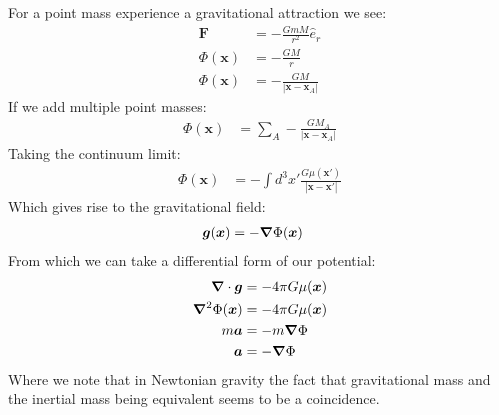 For a point mass experience a gravitational attraction we see:
\begin{align*}
	\bm{F} &= -\frac{GmM}{r^2} \hat{e}_r \\
	\Phi(\bm{x}) &= -\frac{GM}{r} \\
	\Phi(\bm{x}) &= -\frac{GM}{|\bm{x} - \bm{x}_A|}
\end{align*}
If we add multiple point masses:
\begin{align*}
	\Phi(\bm{x}) &= \sum_A-\frac{GM_A}{|\bm{x} - \bm{x}_A|}
\end{align*}
Taking the continuum limit:
\begin{align*}
	\Phi(\bm{x}) &= -\int d^3x' \frac{G\mu(\bm{x}')}{|\bm{x} - \bm{x}'|}
\end{align*}
Which gives rise to the gravitational field:
\begin{align*}
	\bm{g}(\bm{x}) &= -\bm{\nabla}\Phi(\bm{x})
\end{align*}
From which we can take a differential form of our potential:
\begin{align*}
	\bm{\nabla}\cdot\bm{g} &= -4\pi G\mu(\bm{x}) \\
	\bm{\nabla}^2\Phi(\bm{x}) &= -4\pi G\mu(\bm{x}) \\
	m\bm{a} &= -m\bm{\nabla}\Phi \\
	\bm{a} &= -\bm{\nabla}\Phi
\end{align*}
Where we note that in Newtonian gravity the fact that gravitational mass and the inertial mass being equivalent seems to be a coincidence.
